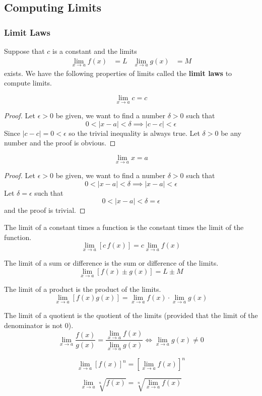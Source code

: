 \subsection{Computing Limits}

\subsubsection{Limit Laws}
Suppose that \(c\) is a constant and the limits
\begin{align*}
    \lim_{x\to a}f(x)&=L & \lim_{x\to a}g(x)&=M
\end{align*}
exists.
We have the following properties of limits called the \textbf{limit laws} to
compute limits.
\begin{theorem}
    \[\lim_{x\to a}c=c\]
\end{theorem}
\begin{proof}
    Let \(\epsilon>0\) be given, we want to find a number \(\delta>0\) such
    that \[0<|x-a|<\delta \implies |c-c|<\epsilon\]
    Since \(|c-c|=0<\epsilon\) so the trivial inequality is always true.
    Let \(\delta>0\) be any number and the proof is obvious.
\end{proof}
\begin{theorem}
    \[\lim_{x\to a}x=a\]
\end{theorem}
\begin{proof}
    Let \(\epsilon>0\) be given, we want to find a number \(\delta>0\) such
    that \[0<|x-a|<\delta \implies |x-a|<\epsilon\]
    Let \(\delta=\epsilon\) such that \[0<|x-a|<\delta=\epsilon\]
    and the proof is trivial.
\end{proof}
\begin{theorem}
    The limit of a constant times a function is the constant times the limit
    of the function.
    \[\lim_{x\to a}[c\,f(x)]=c\lim_{x\to a}f(x)\]
\end{theorem}
\begin{theorem}
    The limit of a sum or difference is the sum or difference of the limits.
    \[\lim_{x\to a}[f(x)\pm g(x)]=L\pm M\]
\end{theorem}
\begin{theorem}
    The limit of a product is the product of the limits.
    \[\lim_{x\to a}[f(x)g(x)]=\lim_{x\to a}f(x)\cdot\lim_{x\to a}g(x)\]
\end{theorem}
\begin{theorem}
    The limit of a quotient is the quotient of the limits (provided that the
    limit of the denominator is not 0).
    \[\lim_{x\to a}\frac{f(x)}{g(x)}=\frac{\lim_{x\to a}f(x)}{\lim_{x\to a}g(x)}
    \iff \lim_{x\to a}g(x)\neq0\]
\end{theorem}
\begin{theorem}
    \[\lim_{x\to a}[f(x)]^n = [\lim_{x\to a}f(x)]^n\]
\end{theorem}
\begin{theorem}
    \[\lim_{x\to a}\sqrt[n]{f(x)} = \sqrt[n]{\lim_{x\to a}f(x)}\]
\end{theorem}